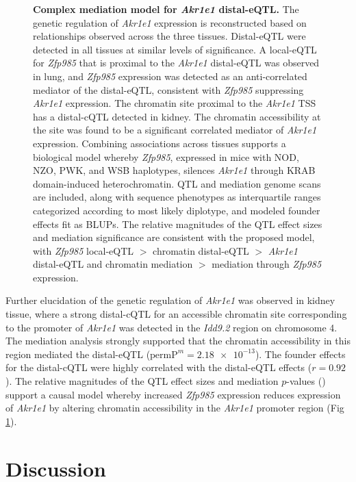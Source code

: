 \documentclass[10pt,letterpaper]{article}
\newcommand{\permpmed}{\text{permP}^{m}}
\begin{document}
\begin{figure}[h!]
\caption{\textbf{Complex mediation model for \textit{Akr1e1} distal-eQTL.}  The genetic regulation of \textit{Akr1e1} expression is reconstructed based on relationships observed across the three tissues. Distal-eQTL were detected in all tissues at similar levels of significance. A local-eQTL for \textit{Zfp985} that is proximal to the \textit{Akr1e1} distal-eQTL was observed in lung, and \textit{Zfp985} expression was detected as an anti-correlated mediator of the distal-eQTL, consistent with \textit{Zfp985} suppressing \textit{Akr1e1} expression. The chromatin site proximal to the \textit{Akr1e1} TSS has a distal-cQTL detected in kidney. The chromatin accessibility at the site was found to be a significant correlated mediator of \textit{Akr1e1} expression. Combining associations across tissues supports a biological model whereby \textit{Zfp985}, expressed in mice with NOD, NZO, PWK, and WSB haplotypes, silences \textit{Akr1e1} through KRAB domain-induced heterochromatin. QTL and mediation genome scans are included, along with sequence phenotypes as interquartile ranges categorized according to most likely diplotype, and modeled founder effects fit as BLUPs. The relative magnitudes of the QTL effect sizes and mediation significance are consistent with the proposed model, with \textit{Zfp985} local-eQTL $>$ chromatin distal-eQTL $>$ \textit{Akr1e1} distal-eQTL and chromatin mediation $>$ mediation through \textit{Zfp985} expression.
\label{fig:akr1e1_full_model}}
\end{figure}
  
Further elucidation of the genetic regulation of \textit{Akr1e1} was observed in kidney tissue, where a strong distal-cQTL for an accessible chromatin site corresponding to the promoter of \textit{Akr1e1} was detected in the \textit{Idd9.2} region on chromosome 4. The mediation analysis strongly supported that the chromatin accessibility in this region mediated the distal-eQTL ($\permpmed = \num{2.18e-13}$). The founder effects for the distal-cQTL were highly correlated with the distal-eQTL effects ($r = 0.92$). The relative magnitudes of the QTL effect sizes and mediation $p$-values () support a causal model whereby increased \textit{Zfp985} expression reduces expression of \textit{Akr1e1} by altering chromatin accessibility in the \textit{Akr1e1} promoter region (Fig \ref{fig:akr1e1_full_model}). 

\section*{Discussion}
\end{document}
